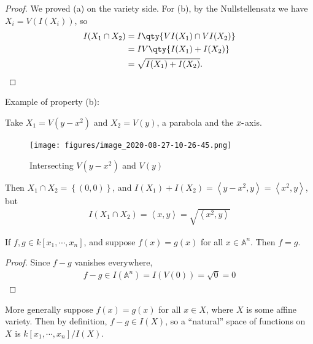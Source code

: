 \begin{proof}

We proved (a) on the variety side. For (b), by the Nullstellensatz we
have \(X_i = V(I(X_i))\), so
\begin{align*}  
I(X_1\cap X_2) 
&=
I\qty{ VI(X_1) \cap VI(X_2)} \\
&=
IV\qty{I(X_1) + I(X_2)} \\
&= \sqrt{I(X_1) + I(X_2)}
.\end{align*}

\end{proof}

\begin{example}

Example of property (b):

Take \(X_1 = V(y-x^2)\) and \(X_2 = V(y)\), a parabola and the
\(x{\hbox{-}}\)axis.

\begin{figure}
\centering
\texttt{[image: figures/image\_2020-08-27-10-26-45.png]}
\caption{Intersecting \(V(y-x^2)\) and \(V(y)\)}
\end{figure}

Then \(X_1 \cap X_2 = \left\{{(0, 0)}\right\}\), and
\(I(X_1) + I(X_2) = \left\langle{y-x^2, y}\right\rangle = \left\langle{x^2, y}\right\rangle\),
but
\begin{align*}
I(X_1 \cap X_2) = \left\langle{x, y}\right\rangle = \sqrt{\left\langle{x^2, y}\right\rangle}
\end{align*}

\end{example}

\begin{proposition}[?]

If \(f, g\in k[x_1, \cdots, x_n]\), and suppose \(f(x) = g(x)\) for all
\(x\in {\mathbb{A}}^n\). Then \(f = g\).

\end{proposition}

\begin{proof}

Since \(f-g\) vanishes everywhere,
\begin{align*}
f-g \in I({\mathbb{A}}^n) = I(V(0)) = \sqrt{0} = 0
\end{align*}

\end{proof}

More generally suppose \(f(x) = g(x)\) for all \(x\in X\), where \(X\)
is some affine variety. Then by definition, \(f-g \in I(X)\), so a
``natural'' space of functions on \(X\) is \(k[x_1,\cdots, x_n]/I(X)\).

